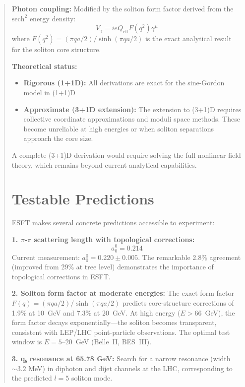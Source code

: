﻿\documentclass[twocolumn,prd,amsmath,amssymb,aps]{revtex4-2}
\begin{document}
\begin{abstract}
\textbf{Photon coupling:} Modified by the soliton form factor derived from the $\text{sech}^2$ energy density:
\begin{equation}
V_{\gamma} = ieQ_{\text{eff}} F(q^2) \gamma^\mu
\end{equation}
where $F(q^2) = (\pi qa/2)/\sinh(\pi qa/2)$ is the exact analytical result for the soliton core structure.

\textbf{Theoretical status:} 
\begin{itemize}
\item \textbf{Rigorous (1+1D):} All derivations are exact for the sine-Gordon model in (1+1)D
\item \textbf{Approximate (3+1D extension):} The extension to (3+1)D requires collective coordinate approximations and moduli space methods. These become unreliable at high energies or when soliton separations approach the core size.
\end{itemize}

A complete (3+1)D derivation would require solving the full nonlinear field theory, which remains beyond current analytical capabilities.

\section{Testable Predictions}

ESFT makes several concrete predictions accessible to experiment:

\textbf{1. $\pi$-$\pi$ scattering length with topological corrections:}
\begin{equation}
a_0^0 = 0.214
\end{equation}
Current measurement: $a_0^0 = 0.220 \pm 0.005$. The remarkable 2.8\% agreement (improved from 29\% at tree level) demonstrates the importance of topological corrections in ESFT.

\textbf{2. Soliton form factor at moderate energies:}
The exact form factor $F(q) = (\pi qa/2)/\sinh(\pi qa/2)$ predicts core-structure corrections of 1.9\% at 10~GeV and 7.3\% at 20~GeV. At high energy ($E > 66$~GeV), the form factor decays exponentially---the soliton becomes transparent, consistent with LEP/LHC point-particle observations. The optimal test window is $E = 5$--$20$~GeV (Belle~II, BES~III).

\textbf{3. q₆ resonance at 65.78 GeV:}
Search for a narrow resonance (width $\sim 3.2$ MeV) in diphoton and dijet channels at the LHC, corresponding to the predicted $l=5$ soliton mode.


\end{abstract}
\end{document}
